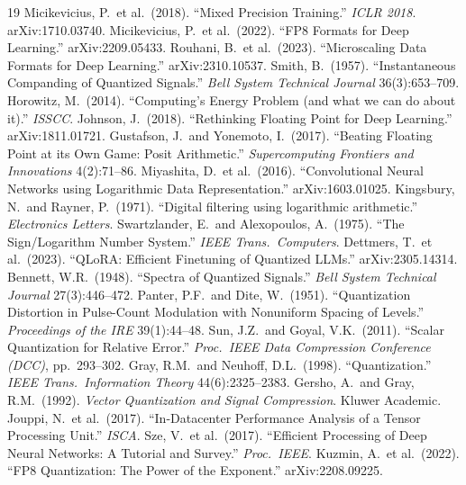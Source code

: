 \documentclass[11pt,letterpaper]{article}
\theoremstyle{definition}
\theoremstyle{remark}
\begin{document}
\begin{thebibliography}{19}
   Micikevicius, P.\ et al.\ (2018).
    ``Mixed Precision Training.''
    \textit{ICLR 2018}. arXiv:1710.03740.
   Micikevicius, P.\ et al.\ (2022).
    ``FP8 Formats for Deep Learning.''
    arXiv:2209.05433.
   Rouhani, B.\ et al.\ (2023).
    ``Microscaling Data Formats for Deep Learning.''
    arXiv:2310.10537.
   Smith, B.\ (1957).
    ``Instantaneous Companding of Quantized Signals.''
    \textit{Bell System Technical Journal} 36(3):653--709.
   Horowitz, M.\ (2014).
    ``Computing's Energy Problem (and what we can do about it).''
    \textit{ISSCC}.
   Johnson, J.\ (2018).
    ``Rethinking Floating Point for Deep Learning.''
    arXiv:1811.01721.
   Gustafson, J.\ and Yonemoto, I.\ (2017).
    ``Beating Floating Point at its Own Game: Posit Arithmetic.''
    \textit{Supercomputing Frontiers and Innovations} 4(2):71--86.
   Miyashita, D.\ et al.\ (2016).
    ``Convolutional Neural Networks using Logarithmic Data Representation.''
    arXiv:1603.01025.
   Kingsbury, N.\ and Rayner, P.\ (1971).
    ``Digital filtering using logarithmic arithmetic.''
    \textit{Electronics Letters}.
   Swartzlander, E.\ and Alexopoulos, A.\ (1975).
    ``The Sign/Logarithm Number System.''
    \textit{IEEE Trans.\ Computers}.
   Dettmers, T.\ et al.\ (2023).
    ``QLoRA: Efficient Finetuning of Quantized LLMs.''
    arXiv:2305.14314.
   Bennett, W.R.\ (1948).
    ``Spectra of Quantized Signals.''
    \textit{Bell System Technical Journal} 27(3):446--472.
   Panter, P.F.\ and Dite, W.\ (1951).
    ``Quantization Distortion in Pulse-Count Modulation with Nonuniform
    Spacing of Levels.''
    \textit{Proceedings of the IRE} 39(1):44--48.
   Sun, J.Z.\ and Goyal, V.K.\ (2011).
    ``Scalar Quantization for Relative Error.''
    \textit{Proc.\ IEEE Data Compression Conference (DCC)}, pp.~293--302.
   Gray, R.M.\ and Neuhoff, D.L.\ (1998).
    ``Quantization.''
    \textit{IEEE Trans.\ Information Theory} 44(6):2325--2383.
   Gersho, A.\ and Gray, R.M.\ (1992).
    \textit{Vector Quantization and Signal Compression}.
    Kluwer Academic.
   Jouppi, N.\ et al.\ (2017).
    ``In-Datacenter Performance Analysis of a Tensor Processing Unit.''
    \textit{ISCA}.
   Sze, V.\ et al.\ (2017).
    ``Efficient Processing of Deep Neural Networks: A Tutorial and Survey.''
    \textit{Proc.\ IEEE}.
   Kuzmin, A.\ et al.\ (2022).
    ``FP8 Quantization: The Power of the Exponent.''
    arXiv:2208.09225.
\end{thebibliography}
\end{document}
